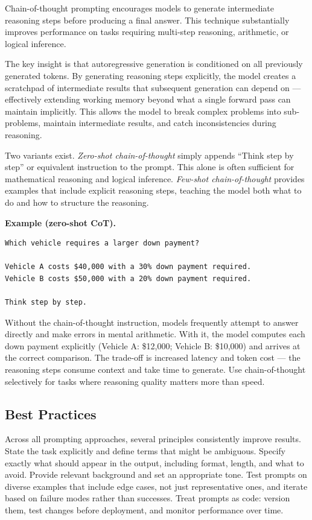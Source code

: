 \documentclass{book}
\begin{document}
Chain-of-thought prompting encourages models to generate intermediate
reasoning steps before producing a final answer. This technique
substantially improves performance on tasks requiring multi-step reasoning,
arithmetic, or logical inference.

The key insight is that autoregressive generation is conditioned on all
previously generated tokens. By generating reasoning steps explicitly, the
model creates a scratchpad of intermediate results that subsequent generation
can depend on --- effectively extending working memory beyond what a single
forward pass can maintain implicitly. This allows the model to break complex
problems into sub-problems, maintain intermediate results, and catch
inconsistencies during reasoning.

Two variants exist. \emph{Zero-shot chain-of-thought} simply appends
``Think step by step'' or equivalent instruction to the prompt. This alone
is often sufficient for mathematical reasoning and logical inference.
\emph{Few-shot chain-of-thought} provides examples that include explicit
reasoning steps, teaching the model both what to do and how to structure
the reasoning.

\textbf{Example (zero-shot CoT).}
\begin{verbatim}
Which vehicle requires a larger down payment?

Vehicle A costs $40,000 with a 30% down payment required.
Vehicle B costs $50,000 with a 20% down payment required.

Think step by step.
\end{verbatim}

Without the chain-of-thought instruction, models frequently attempt to
answer directly and make errors in mental arithmetic. With it, the model
computes each down payment explicitly (Vehicle A: \$12,000; Vehicle B:
\$10,000) and arrives at the correct comparison. The trade-off is increased
latency and token cost --- the reasoning steps consume context and take
time to generate. Use chain-of-thought selectively for tasks where
reasoning quality matters more than speed.

\subsection{Best Practices}
\label{sec:prompting_best_practices}

Across all prompting approaches, several principles consistently improve
results. State the task explicitly and define terms that might be
ambiguous. Specify exactly what should appear in the output, including
format, length, and what to avoid. Provide relevant background and set
an appropriate tone. Test prompts on diverse examples that include edge
cases, not just representative ones, and iterate based on failure modes
rather than successes. Treat prompts as code: version them, test changes
before deployment, and monitor performance over time.
\end{document}
